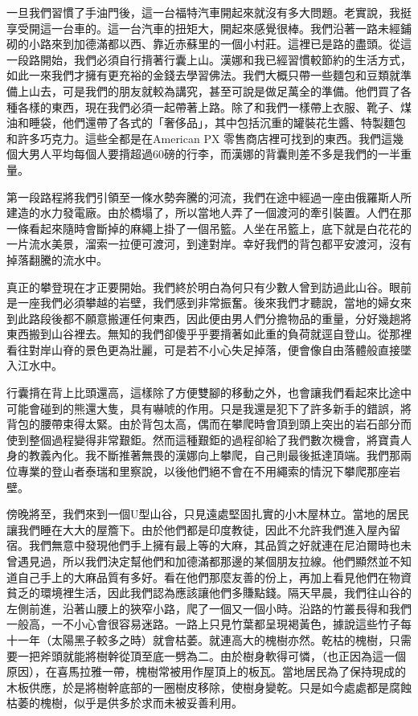 一旦我們習慣了手油門後，這一台福特汽車開起來就沒有多大問題。老實說，我挺享受開這一台車的。這一台汽車的扭矩大，開起來感覺很棒。我們沿著一路未經鋪砌的小路來到加德滿都以西、靠近赤蘇里的一個小村莊。這裡已是路的盡頭。從這一段路開始，我們必須自行揹著行囊上山。漢娜和我已經習慣較節約的生活方式，如此一來我們才擁有更充裕的金錢去學習佛法。我們大概只帶一些麵包和豆類就準備上山去，可是我們的朋友就較為講究，甚至可說是做足萬全的準備。他們買了各種各樣的東西，現在我們必須一起帶著上路。除了和我們一樣帶上衣服、靴子、煤油和睡袋，他們還帶了各式的「奢侈品」，其中包括沉重的罐裝花生醬、特製麵包和許多巧克力。這些全都是在American
PX
零售商店裡可找到的東西。我們這幾個大男人平均每個人要揹超過60磅的行李，而漢娜的背囊則差不多是我們的一半重量。

第一段路程將我們引領至一條水勢奔騰的河流，我們在途中經過一座由俄羅斯人所建造的水力發電廠。由於橋塌了，所以當地人弄了一個渡河的牽引裝置。人們在那一條看起來隨時會斷掉的麻繩上掛了一個吊籃。人坐在吊籃上，底下就是白花花的一片流水美景，溜索一拉便可渡河，到達對岸。幸好我們的背包都平安渡河，沒有掉落翻騰的流水中。

真正的攀登現在才正要開始。我們終於明白為何只有少數人曾到訪過此山谷。眼前是一座我們必須攀越的岩壁，我們感到非常振奮。後來我們才聽說，當地的婦女來到此路段後都不願意搬運任何東西，因此便由男人們分擔物品的重量，分好幾趟將東西搬到山谷裡去。無知的我們卻傻乎乎要揹著如此重的負荷就逕自登山。從那裡看往對岸山脊的景色更為壯麗，可是若不小心失足掉落，便會像自由落體般直接墜入江水中。

行囊揹在背上比頭還高，這樣除了方便雙腳的移動之外，也會讓我們看起來比途中可能會碰到的熊還大隻，具有嚇唬的作用。只是我還是犯下了許多新手的錯誤，將背包的腰帶束得太緊。由於背包太高，偶而在攀爬時會頂到頭上突出的岩石部分而使到整個過程變得非常艱鉅。然而這種艱鉅的過程卻給了我們數次機會，將寶貴人身的教義內化。我不斷推著無畏的漢娜向上攀爬，自己則最後抵達頂端。我們那兩位專業的登山者泰瑞和里察說，以後他們絕不會在不用繩索的情況下攀爬那座岩壁。

傍晚將至，我們來到一個U型山谷，只見遠處堅固扎實的小木屋林立。當地的居民讓我們睡在大大的屋簷下。由於他們都是印度教徒，因此不允許我們進入屋內留宿。我們無意中發現他們手上擁有最上等的大麻，其品質之好就連在尼泊爾時也未曾遇見過，所以我們決定幫他們和加德滿都那邊的某個朋友拉線。他們顯然並不知道自己手上的大麻品質有多好。看在他們那麼友善的份上，再加上看見他們在物資貧乏的環境裡生活，因此我們認為應該讓他們多賺點錢。隔天早晨，我們往山谷的左側前進，沿著山腰上的狹窄小路，爬了一個又一個小時。沿路的竹叢長得和我們一般高，一不小心會很容易迷路。一路上只見竹葉都呈現褐黃色，據說這些竹子每十一年（太陽黑子較多之時）就會枯萎。就連高大的槐樹亦然。乾枯的槐樹，只需要一把斧頭就能將樹幹從頂至底一劈為二。由於樹身軟得可憐，（也正因為這一個原因），在喜馬拉雅一帶，槐樹常被用作屋頂上的板瓦。當地居民為了保持現成的木板供應，於是將樹幹底部的一圈樹皮移除，使樹身變乾。只是如今處處都是腐蝕枯萎的槐樹，似乎是供多於求而未被妥善利用。


